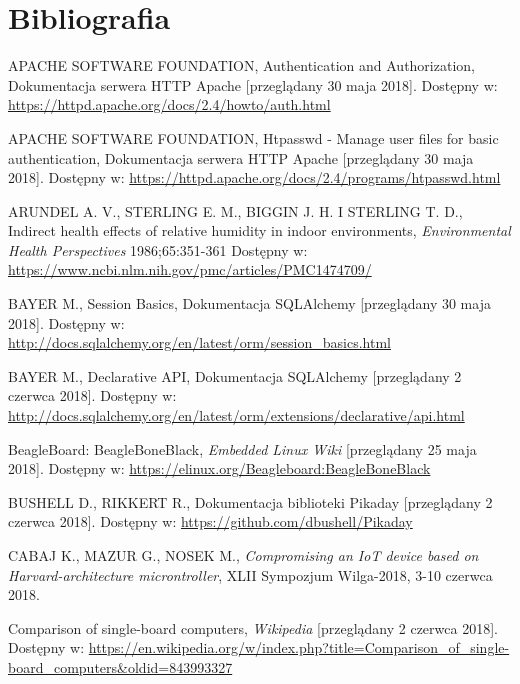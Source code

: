 \documentclass[a4paper,11pt,twoside]{article}
\begin{document}
\section{Bibliografia}
\begin{thebibliography}{9}

\uppercase{Apache Software Foundation}, Authentication and Authorization, Dokumentacja serwera HTTP Apache [przeglądany 30 maja 2018].
Dostępny w: \url{https://httpd.apache.org/docs/2.4/howto/auth.html}

\uppercase{Apache Software Foundation}, Htpasswd - Manage user files for basic authentication, Dokumentacja serwera HTTP Apache [przeglądany 30 maja 2018].
Dostępny w: \url{https://httpd.apache.org/docs/2.4/programs/htpasswd.html}

\uppercase{Arundel A. V., Sterling E. M., Biggin J. H. i Sterling T. D.}, Indirect health effects of relative humidity in indoor environments, \textit{Environmental Health Perspectives} 1986;65:351-361
Dostępny w: \url{https://www.ncbi.nlm.nih.gov/pmc/articles/PMC1474709/}

\uppercase{Bayer M.}, Session Basics, Dokumentacja SQLAlchemy [przeglądany 30 maja 2018].
Dostępny w: \url{http://docs.sqlalchemy.org/en/latest/orm/session_basics.html}

\uppercase{Bayer M.}, Declarative API, Dokumentacja SQLAlchemy [przeglądany 2 czerwca 2018].
Dostępny w: \url{http://docs.sqlalchemy.org/en/latest/orm/extensions/declarative/api.html}

BeagleBoard: BeagleBoneBlack, \textit{Embedded Linux Wiki} [przeglądany 25 maja 2018].
Dostępny w: \url{https://elinux.org/Beagleboard:BeagleBoneBlack}

\uppercase{Bushell D., Rikkert R.}, Dokumentacja biblioteki Pikaday [przeglądany 2 czerwca 2018].
Dostępny w: \url{https://github.com/dbushell/Pikaday}

\uppercase{Cabaj K., Mazur G., Nosek M.}, \textit{Compromising an IoT device based on Harvard-architecture microntroller}, XLII Sympozjum Wilga-2018, 3-10 czerwca 2018.

Comparison of single-board computers, \textit{Wikipedia} [przeglądany 2 czerwca 2018].
Dostępny w: \url{https://en.wikipedia.org/w/index.php?title=Comparison_of_single-board_computers&oldid=843993327}


\end{thebibliography}
\end{document}

